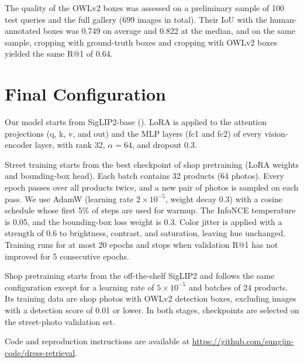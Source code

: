 \documentclass[sigconf,nonacm]{acmart}
\begin{document}
The quality of the OWLv2 boxes was assessed on a preliminary sample of 100 test queries and the full gallery (699 images in total). Their IoU with the human-annotated boxes was 0.749 on average and 0.822 at the median, and on the same sample, cropping with ground-truth boxes and cropping with OWLv2 boxes yielded the same R@1 of 0.64.

\section{Final Configuration}
\label{app:config}

Our model starts from SigLIP2-base (). LoRA is applied to the attention projections (q, k, v, and out) and the MLP layers (fc1 and fc2) of every vision-encoder layer, with rank 32, $\alpha = 64$, and dropout 0.3.

Street training starts from the best checkpoint of shop pretraining (LoRA weights and bounding-box head). Each batch contains 32 products (64 photos). Every epoch passes over all products twice, and a new pair of photos is sampled on each pass. We use AdamW (learning rate $2\times10^{-5}$, weight decay 0.3) with a cosine schedule whose first 5\% of steps are used for warmup. The InfoNCE temperature is 0.05, and the bounding-box loss weight is 0.3. Color jitter is applied with a strength of 0.6 to brightness, contrast, and saturation, leaving hue unchanged. Training runs for at most 20 epochs and stops when validation R@1 has not improved for 5 consecutive epochs.

Shop pretraining starts from the off-the-shelf SigLIP2 and follows the same configuration except for a learning rate of $5\times10^{-5}$ and batches of 24 products. Its training data are shop photos with OWLv2 detection boxes, excluding images with a detection score of 0.01 or lower. In both stages, checkpoints are selected on the street-photo validation set.

Code and reproduction instructions are available at \url{https://github.com/sungjin-code/dress-retrieval}.
\end{document}
